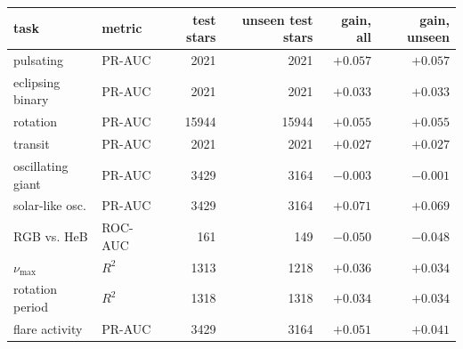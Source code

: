\begin{tabular}{llrrrr}
\toprule
task & metric & test stars & unseen test stars & gain, all & gain, unseen \\
\midrule
pulsating & PR-AUC & 2021 & 2021 & $\boldsymbol{+}\mathbf{0.057}$ & $\boldsymbol{+}\mathbf{0.057}$ \\
eclipsing binary & PR-AUC & 2021 & 2021 & $\boldsymbol{+}\mathbf{0.033}$ & $\boldsymbol{+}\mathbf{0.033}$ \\
rotation & PR-AUC & 15944 & 15944 & $\boldsymbol{+}\mathbf{0.055}$ & $\boldsymbol{+}\mathbf{0.055}$ \\
transit & PR-AUC & 2021 & 2021 & $\boldsymbol{+}\mathbf{0.027}$ & $\boldsymbol{+}\mathbf{0.027}$ \\
oscillating giant & PR-AUC & 3429 & 3164 & $\boldsymbol{-}\mathbf{0.003}$ & ${-}0.001$ \\
solar-like osc. & PR-AUC & 3429 & 3164 & $\boldsymbol{+}\mathbf{0.071}$ & $\boldsymbol{+}\mathbf{0.069}$ \\
RGB vs. HeB & ROC-AUC & 161 & 149 & $\boldsymbol{-}\mathbf{0.050}$ & $\boldsymbol{-}\mathbf{0.048}$ \\
$\nu_{\max}$ & $R^2$ & 1313 & 1218 & $\boldsymbol{+}\mathbf{0.036}$ & $\boldsymbol{+}\mathbf{0.034}$ \\
rotation period & $R^2$ & 1318 & 1318 & $\boldsymbol{+}\mathbf{0.034}$ & $\boldsymbol{+}\mathbf{0.034}$ \\
flare activity & PR-AUC & 3429 & 3164 & $\boldsymbol{+}\mathbf{0.051}$ & $\boldsymbol{+}\mathbf{0.041}$ \\
\bottomrule
\end{tabular}
